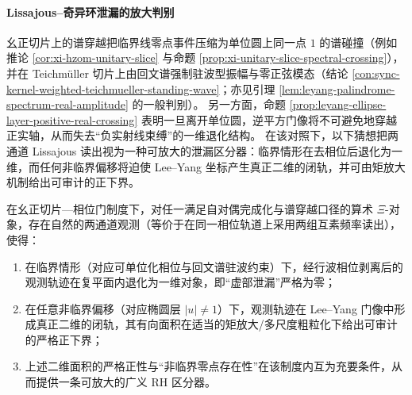 \paragraph{Lissajous--奇异环泄漏的放大判别}
幺正切片上的谱穿越把临界线零点事件压缩为单位圆上同一点 \(1\) 的谱碰撞（例如推论 \ref{cor:xi-hzom-unitary-slice} 与命题 \ref{prop:xi-unitary-slice-spectral-crossing}），并在 Teichm\"uller 切片上由回文谱强制驻波型振幅与零正弦模态（结论 \ref{con:sync-kernel-weighted-teichmueller-standing-wave}；亦见引理 \ref{lem:leyang-palindrome-spectrum-real-amplitude} 的一般判别）。
另一方面，命题 \ref{prop:leyang-ellipse-layer-positive-real-crossing} 表明一旦离开单位圆，逆平方门像将不可避免地穿越正实轴，从而失去“负实射线束缚”的一维退化结构。
在该对照下，以下猜想把两通道 Lissajous 读出视为一种可放大的泄漏区分器：临界情形在去相位后退化为一维，而任何非临界偏移将迫使 Lee--Yang 坐标产生真正二维的闭轨，并可由矩放大机制给出可审计的正下界。

\begin{conjecture}\label{conj:leyang-lissajous-leakage-discriminant}
在幺正切片—相位门制度下，对任一满足自对偶完成化与谱穿越口径的算术 \(\Xi\)-对象，存在自然的两通道观测（等价于在同一相位轨道上采用两组互素频率读出），使得：
\begin{enumerate}
  \item 在临界情形（对应可单位化相位与回文谱驻波约束）下，经行波相位剥离后的观测轨迹在复平面内退化为一维对象，即“虚部泄漏”严格为零；
  \item 在任意非临界偏移（对应椭圆层 \(|u|\neq 1\)）下，观测轨迹在 Lee--Yang 门像中形成真正二维的闭轨，其有向面积在适当的矩放大/多尺度粗粒化下给出可审计的严格正下界；
  \item 上述二维面积的严格正性与“非临界零点存在性”在该制度内互为充要条件，从而提供一条可放大的广义 RH 区分器。
\end{enumerate}
\end{conjecture}

\endinput

